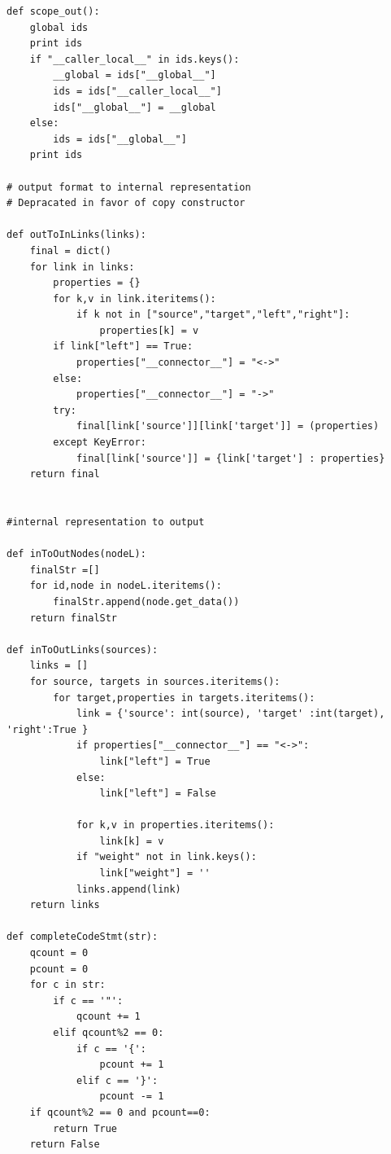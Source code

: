\documentclass[a4paper]{article}
\begin{document}
\begin{verbatim}
def scope_out():
    global ids
    print ids
    if "__caller_local__" in ids.keys():
        __global = ids["__global__"]
        ids = ids["__caller_local__"]
        ids["__global__"] = __global
    else:
        ids = ids["__global__"]
    print ids
    
# output format to internal representation
# Depracated in favor of copy constructor

def outToInLinks(links):
    final = dict()
    for link in links:
        properties = {}
        for k,v in link.iteritems():
            if k not in ["source","target","left","right"]:
                properties[k] = v
        if link["left"] == True:
            properties["__connector__"] = "<->"
        else:
            properties["__connector__"] = "->"
        try:
            final[link['source']][link['target']] = (properties)
        except KeyError:
            final[link['source']] = {link['target'] : properties}
    return final


#internal representation to output

def inToOutNodes(nodeL):
    finalStr =[]
    for id,node in nodeL.iteritems():
        finalStr.append(node.get_data())
    return finalStr

def inToOutLinks(sources):
    links = []
    for source, targets in sources.iteritems():
        for target,properties in targets.iteritems():
            link = {'source': int(source), 'target' :int(target), 'right':True }
            if properties["__connector__"] == "<->":
                link["left"] = True
            else:
                link["left"] = False

            for k,v in properties.iteritems():
                link[k] = v
            if "weight" not in link.keys():
                link["weight"] = ''
            links.append(link)
    return links

def completeCodeStmt(str):
    qcount = 0
    pcount = 0
    for c in str:
        if c == '"':
            qcount += 1
        elif qcount%2 == 0:
            if c == '{':
                pcount += 1
            elif c == '}':
                pcount -= 1
    if qcount%2 == 0 and pcount==0:
        return True
    return False 
    
\end{verbatim}
\end{document}
